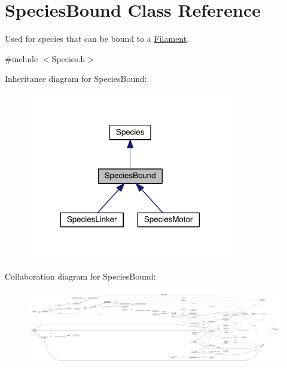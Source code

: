 \hypertarget{classSpeciesBound}{\section{Species\+Bound Class Reference}
\label{classSpeciesBound}
}


Used for species that can be bound to a \hyperlink{classFilament}{Filament}.  




{\ttfamily \#include $<$Species.\+h$>$}



Inheritance diagram for Species\+Bound\+:\nopagebreak
\begin{figure}[H]
\begin{center}
\leavevmode
\includegraphics[width=254pt]{classSpeciesBound__inherit__graph}
\end{center}
\end{figure}


Collaboration diagram for Species\+Bound\+:
\nopagebreak
\begin{figure}[H]
\begin{center}
\leavevmode
\includegraphics[width=350pt]{classSpeciesBound__coll__graph}
\end{center}
\end{figure}
